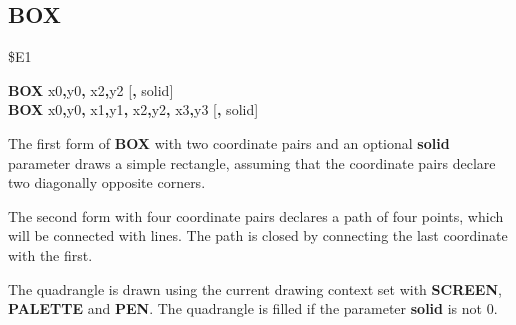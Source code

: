 \subsection{BOX}
\begin{description}[leftmargin=2cm,style=nextline]
\item [Token:] \$E1
\item [Format:] {\bf BOX} x0{\bf,}y0{\bf,} x2{\bf,}y2 [{\bf,} solid] \\
                {\bf BOX} x0{\bf,}y0{\bf,} x1{\bf,}y1{\bf,}
                x2{\bf,}y2{\bf,} x3{\bf,}y3 [{\bf,} solid]
\item [Usage:] The first form of {\bf BOX} with
               two coordinate pairs and an optional {\bf solid} parameter
               draws a simple rectangle, assuming that the
               coordinate pairs declare two diagonally opposite corners.

               The second form with four coordinate pairs declares a
               path of four points, which will be connected with lines.
               The path is closed by connecting the last coordinate with the
               first.

               The quadrangle is drawn using the current drawing context
               set with {\bf SCREEN}, {\bf PALETTE} and {\bf PEN}.
               The quadrangle is filled if the parameter {\bf solid}
               is not 0.


\end{description}
